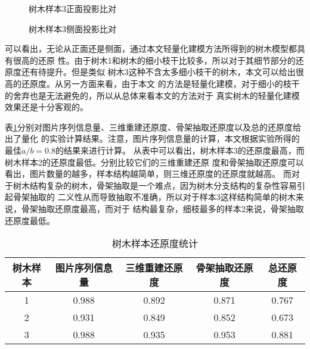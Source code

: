 \begin{figure}
	\centering
	\hspace{3em}
	\hspace{3em}
	\hspace{3em}
	\hspace{3em}
	\caption{树木样本3正面投影比对}
	\label{fig:s3proj1}
\end{figure}
\begin{figure}
	\centering
	\hspace{3em}
	\hspace{3em}
	\hspace{3em}
	\hspace{3em}
	\caption{树木样本3侧面投影比对}
	\label{fig:s3proj2}
\end{figure}

\clearpage
可以看出，无论从正面还是侧面，通过本文轻量化建模方法所得到的树木模型都具有很高的还原
性。由于树木1和树木的细小枝干比较多，所以对于其细节部分的还原度还有待提升。但是类似
树木3这种不含太多细小枝干的树木，本文可以给出很高的还原度。从另一方面来看，由于本文
的方法是轻量化建模，对于细小的枝干的舍弃也是无法避免的，所以从总体来看本文的方法对于
真实树木的轻量化建模效果还是十分客观的。

表\ref{tab:restore}分别对图片序列信息量、三维重建还原度、骨架抽取还原度以及总的还原度给出了量化
的实验计算结果。注意，图片序列信息量的计算，本文根据实验所得的最佳$a/b=0.8$的结果来进行计算。
从表中可以看出，树木样本3的还原度最高，而树木样本2的还原度最低。分别比较它们的三维重建还原
度和骨架抽取还原度可以看出，图片数量的越多，样本结构越简单，则三维还原度的还原度就越高。
而对于树木结构复杂的树木，骨架抽取是一个难点，因为树木分支结构的复杂性容易引起骨架抽取的
二义性从而导致抽取不准确，所以对于样本3这样结构简单的树木来说，骨架抽取还原度最高，而对于
结构最复杂，细枝最多的样本2来说，骨架抽取还原度最低。
\\
\begin{table}[H]
	\caption{树木样本还原度统计}
	\centering
\begin{tabular}{c|cccc} \label{tab:restore}
	树木样本& 图片序列信息量 & 三维重建还原度 & 骨架抽取还原度 & 总还原度\\
	\hline
	1		& 0.988			 & 0.892		  & 0.871		   & 0.767\\
	2		& 0.931			 & 0.849		  & 0.852		   & 0.673\\
	3		& 0.988			 & 0.935		  & 0.953		   & 0.881\\
\end{tabular}
\end{table}

